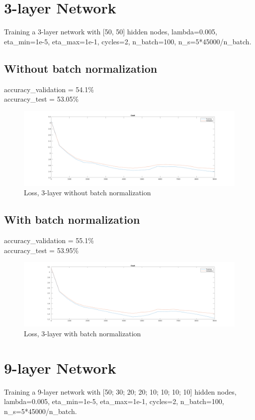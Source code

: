 \clearpage
\section{3-layer Network}
Training a 3-layer network with [50, 50] hidden nodes, lambda=0.005, eta\_min=1e-5, eta\_max=1e-1, cycles=2, n\_batch=100, n\_s=5*45000/n\_batch.
\subsection{Without batch normalization}
accuracy\_validation = 54.1\%\\
accuracy\_test = 53.05\%
\begin{figure}[ht]
    \includegraphics[width=\textwidth]{../code/result_pics/cost_lambda=0.00500_ns=2250_cycles=2_k=3_bn=0.png}
    \caption{Loss, 3-layer without batch normalization}
\end{figure}

\subsection{With batch normalization}
accuracy\_validation = 55.1\%\\
accuracy\_test = 53.95\%
\begin{figure}[ht]
    \includegraphics[width=\textwidth]{../code/result_pics/cost_lambda=0.00500_ns=2250_cycles=2_k=3_bn=1.png}
    \caption{Loss, 3-layer with batch normalization}
\end{figure}
\clearpage

\section{9-layer Network}
Training a 9-layer network with [50; 30; 20; 20; 10; 10; 10; 10] hidden nodes, lambda=0.005, eta\_min=1e-5, eta\_max=1e-1, cycles=2, n\_batch=100, n\_s=5*45000/n\_batch.
